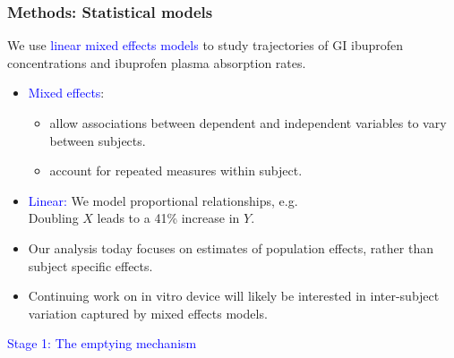 \documentclass[]{beamer}
\begin{document}
\begin{frame}\frametitle{Methods: Statistical models}

\small
We use \textcolor{blue}{linear mixed effects models} to study trajectories of GI ibuprofen concentrations and ibuprofen plasma absorption rates.

\bigskip

\begin{itemize}
	\item \textcolor{blue}{Mixed effects}: 
	\begin{itemize}
		\item allow associations between dependent and independent variables to vary between subjects.
		\item account for repeated measures within subject.
	\end{itemize}
	\item \textcolor{blue}{Linear:}
	We model proportional relationships, e.g.\\
	\smallskip
	\footnotesize
	Doubling $X$ leads to a 41\% increase in $Y$.
	\small

\end{itemize}

\begin{itemize}
	\item Our analysis today focuses on estimates of population effects, rather than subject specific effects.
	\item Continuing work on in vitro device will likely be interested in inter-subject variation captured by mixed effects models.

\end{itemize}

\end{frame}

\begin{frame}

\LARGE
\begin{center}
\textcolor{blue}{Stage 1: The emptying mechanism}
\end{center}
\end{frame}
\end{document}
